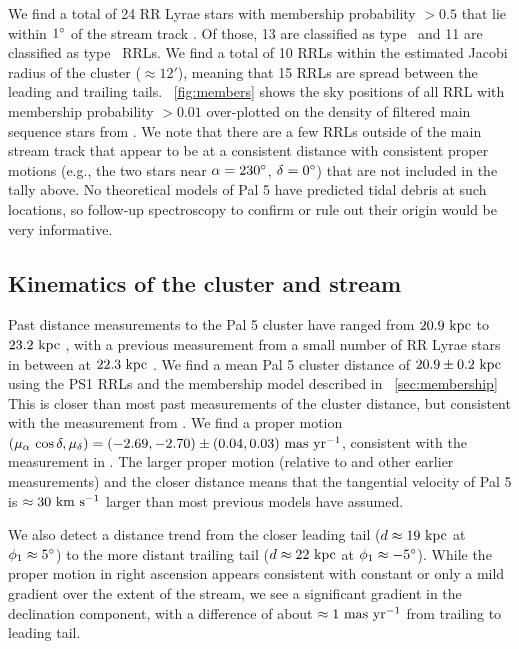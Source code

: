 \documentclass[twocolumn]{aastex63}
\begin{document}
We find a total of 24 RR Lyrae stars with membership probability $> 0.5$ that lie within $1\mbox{$^\circ$}$ of the stream track \citep[again using the track from][]{Bonaca:2019}.
Of those, 13 are classified as type \typeab\ and 11 are classified as type \typec\ RRLs.
We find a total of 10 RRLs within the estimated Jacobi radius of the cluster ($\approx 12'$), meaning that 15 RRLs are spread between the leading and trailing tails.
\figurename~\ref{fig:members} shows the sky positions of all RRL with membership probability $>0.01$ over-plotted on the density of filtered main sequence stars from \citet{Bonaca:2019}.
We note that there are a few RRLs outside of the main stream track that appear to be at a consistent distance with consistent proper motions (e.g., the two stars near $\alpha = 230\mbox{$^\circ$}$, $\delta = 0\mbox{$^\circ$}$) that are not included in the tally above.
No theoretical models of Pal 5 have predicted tidal debris at such locations, so follow-up spectroscopy to confirm or rule out their origin would be very informative.


\subsection{Kinematics of the cluster and stream}

Past distance measurements to the Pal 5 cluster have ranged from $20.9~\mathrm{kpc}$ \citep{Dotter:2011} to $23.2~\mathrm{kpc}$ \citep{Harris:1996}, with a previous measurement from a small number of RR Lyrae stars in between at $22.3~\mathrm{kpc}$ \citep{Vivas:2006}.
We find a mean Pal 5 cluster distance of $20.9 \pm 0.2~\mathrm{kpc}$ using the PS1 RRLs and the membership model described in \sectionname~\ref{sec:membership}
This is closer than most past measurements of the cluster distance, but consistent with the measurement from \citet{Dotter:2011}.
We find a proper motion $(\mu_\alpha\,\cos\delta, \mu_\delta) = (-2.69, -2.70) \pm (0.04, 0.03)~\mathrm{mas}~\mathrm{yr}^{-1}$, consistent with the measurement in \citet{Vasiliev:2019}.
The larger proper motion (relative to \citealt{Fritz:2015} and other earlier measurements) and the closer distance means that the tangential velocity of Pal 5 is $\approx 30~\mathrm{km}~\mathrm{s}^{-1}$ larger than most previous models have assumed.

We also detect a distance trend from the closer leading tail ($d \approx 19~\mathrm{kpc}$ at $\phi_1 \approx 5\mbox{$^\circ$}$) to the more distant trailing tail ($d \approx 22~\mathrm{kpc}$ at $\phi_1 \approx -5\mbox{$^\circ$}$).
While the proper motion in right ascension appears consistent with constant or only a mild gradient over the extent of the stream, we see a significant gradient in the declination component, with a difference of about $\approx 1~\mathrm{mas}~\mathrm{yr}^{-1}$ from trailing to leading tail.
\end{document}
